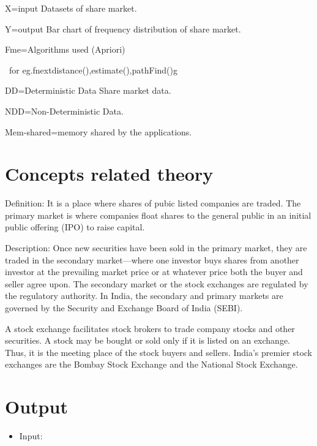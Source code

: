 \documentclass[a4paper]{article}
\begin{document}
{\rmfamily
	X=input
	Datasets of share market.
	
	{\rmfamily
		Y=output
		Bar chart of frequency distribution of share market.}
	
	{\rmfamily
		Fme=Algorithms used (Apriori)}
	
	\textrm{\ for eg.fnextdistance(),estimate(),pathFind()g}
	
	{\rmfamily
		DD=Deterministic Data
		Share market data.
	}
	
	{\rmfamily
		NDD=Non-Deterministic Data.}
	
	{\rmfamily
		Mem-shared=memory shared by the applications.}
	
	
	\bigskip

\section{Concepts related theory}

Definition: It is a place where shares of pubic listed companies are traded. The primary market is where companies float shares to the general public in an initial public offering (IPO) to raise capital.

Description: Once new securities have been sold in the primary market, they are traded in the secondary market—where one investor buys shares from another investor at the prevailing market price or at whatever price both the buyer and seller agree upon. The secondary market or the stock exchanges are regulated by the regulatory authority. In India, the secondary and primary markets are governed by the Security and Exchange Board of India (SEBI).

A stock exchange facilitates stock brokers to trade company stocks and other securities. A stock may be bought or sold only if it is listed on an exchange. Thus, it is the meeting place of the stock buyers and sellers. India's premier stock exchanges are the Bombay Stock Exchange and the National Stock Exchange.

\section{Output}
\begin{itemize} 	
\item Input:


\end{itemize}}
\end{document}
